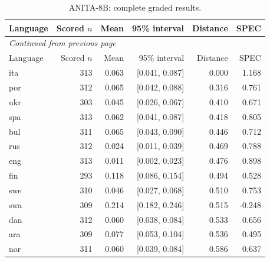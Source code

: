 \endgroup

\begingroup\footnotesize\setlength{\tabcolsep}{3pt}\renewcommand{\arraystretch}{1.12}

\begin{longtable}{lrrrrr}

\caption{ANITA-8B: complete graded results.}\label{tab:detail-llamantino_anita_8b}\\

\toprule

Language & Scored $n$ & Mean & 95\% interval & Distance & SPEC\\\midrule

\endfirsthead

\multicolumn{6}{l}{\textit{Continued from previous page}}\\

\toprule

Language & Scored $n$ & Mean & 95\% interval & Distance & SPEC\\\midrule

\endhead

\bottomrule\endfoot

ita & 313 & 0.063 & [0.041, 0.087] & 0.000 & 1.168\\

por & 312 & 0.065 & [0.042, 0.088] & 0.316 & 0.761\\

ukr & 303 & 0.045 & [0.026, 0.067] & 0.410 & 0.671\\

spa & 313 & 0.062 & [0.041, 0.087] & 0.418 & 0.805\\

bul & 311 & 0.065 & [0.043, 0.090] & 0.446 & 0.712\\

rus & 312 & 0.024 & [0.011, 0.039] & 0.469 & 0.788\\

eng & 313 & 0.011 & [0.002, 0.023] & 0.476 & 0.898\\

fin & 293 & 0.118 & [0.086, 0.154] & 0.494 & 0.528\\

swe & 310 & 0.046 & [0.027, 0.068] & 0.510 & 0.753\\

swa & 309 & 0.214 & [0.182, 0.246] & 0.515 & -0.248\\

dan & 312 & 0.060 & [0.038, 0.084] & 0.533 & 0.656\\

ara & 309 & 0.077 & [0.053, 0.104] & 0.536 & 0.495\\

nor & 311 & 0.060 & [0.039, 0.084] & 0.586 & 0.637\\

\end{longtable}

